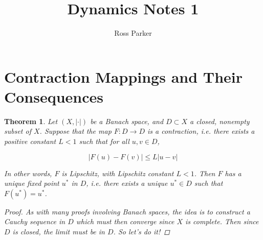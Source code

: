 \documentclass{article}
\title{Dynamics Notes 1}
\author{Ross Parker}
\newtheorem{theorem}{Theorem}[section]
\begin{document}
\section{Contraction Mappings and Their Consequences}


\begin{theorem}Let $(X, |\cdot|)$ be a Banach space, and $D \subset X$ a closed, nonempty subset of $X$. Suppose that the map $F: D \rightarrow D$ is a contraction, i.e. there exists a positive constant $L < 1$ such that for all $u, v \in D$,

\[
|F(u) - F(v)| \leq L|u - v|
\]

In other words, $F$ is Lipschitz, with Lipschitz constant $L < 1$. Then $F$ has a unique fixed point $u^*$ in $D$, i.e. there exists a unique $u^* \in D$ such that $F(u^*) = u^*$.

\begin{proof}
As with many proofs involving Banach spaces, the idea is to construct a Cauchy sequence in $D$ which must then converge since $X$ is complete. Then since $D$ is closed, the limit must be in $D$. So let's do it!


\end{proof}
\end{theorem}
\end{document}
